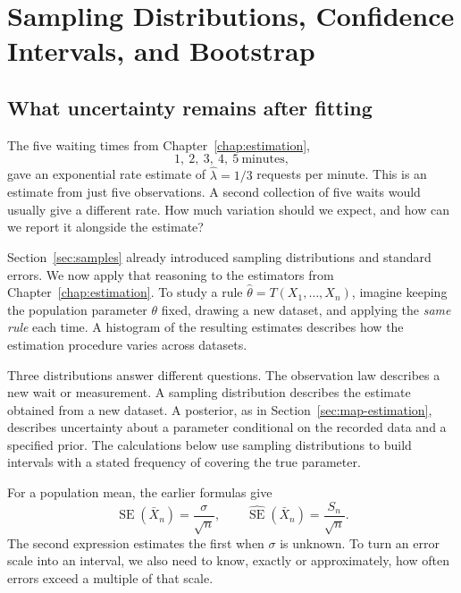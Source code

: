 \chapter{Sampling Distributions, Confidence Intervals, and Bootstrap}
\label{chap:confidence-intervals}

\begingroup
{}


\section{What uncertainty remains after fitting}
\label{sec:interval-uncertainty}

The five waiting times from Chapter~\ref{chap:estimation},
\[
  1,\ 2,\ 3,\ 4,\ 5\ \text{minutes},
\]
gave an exponential rate estimate of \(\widehat\lambda=1/3\) requests
per minute. This is an estimate from just five observations. A second
collection of five waits would usually give a different rate. How much
variation should we expect, and how can we report it alongside the estimate?

Section~\ref{sec:samples} already introduced sampling distributions and
standard errors. We now apply that reasoning to the estimators from
Chapter~\ref{chap:estimation}. To study a rule
\(\widehat\theta=T(X_1,\ldots,X_n)\), imagine keeping the population
parameter \(\theta\) fixed, drawing a new dataset, and applying the
\emph{same rule} each time. A histogram of the resulting estimates describes
how the estimation procedure varies across datasets.

Three distributions answer different questions. The observation law
describes a new wait or measurement. A sampling distribution describes
the estimate obtained from a new dataset. A posterior, as in
Section~\ref{sec:map-estimation}, describes uncertainty about a parameter
conditional on the recorded data and a specified prior. The calculations
below use sampling distributions to build intervals with a stated
frequency of covering the true parameter.

For a population mean, the earlier formulas give
\[
  \operatorname{SE}(\bar X_n)=\frac{\sigma}{\sqrt n},
  \qquad
  \widehat{\operatorname{SE}}(\bar X_n)=\frac{S_n}{\sqrt n}.
\]
The second expression estimates the first when \(\sigma\) is unknown.
To turn an error scale into an interval, we also need to know, exactly
or approximately, how often errors exceed a multiple of that scale.

